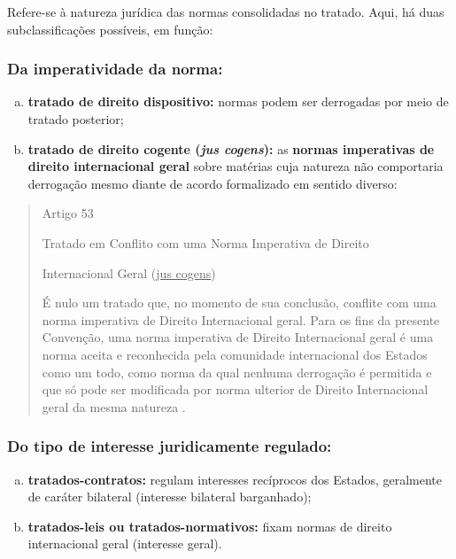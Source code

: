 \documentclass{article}
\begin{document}
Refere-se à natureza jurídica das normas consolidadas no tratado. Aqui, há duas subclassificações possíveis, em função:

\subsubsection{Da imperatividade da norma:}

\begin{enumerate}[(a)]
    \item \textbf{tratado de direito dispositivo:} normas podem ser derrogadas por meio de tratado posterior;
    \item \textbf{tratado de direito cogente (\textit{jus cogens}):} as \textbf{normas imperativas de direito internacional geral} sobre matérias cuja natureza não comportaria derrogação mesmo diante de acordo formalizado em sentido diverso:
\end{enumerate}

\begin{quote}
\begin{center}
    Artigo 53

Tratado em Conflito com uma Norma Imperativa de Direito

Internacional Geral (\underline{jus cogens})
\end{center} 

É nulo um tratado que, no momento de sua conclusão, conflite com uma norma imperativa de Direito Internacional geral. Para os fins da presente Convenção, uma norma imperativa de Direito Internacional geral é uma norma aceita e reconhecida pela comunidade internacional dos Estados como um todo, como norma da qual nenhuma derrogação é permitida e que só pode ser modificada por norma ulterior de Direito Internacional geral da mesma natureza \cite{brasil_decreto_2009}.
\end{quote}

\subsubsection{Do tipo de interesse juridicamente regulado:}

\begin{enumerate}[(a)]
    \item \textbf{tratados-contratos:} regulam interesses recíprocos dos Estados, geralmente de caráter bilateral (interesse bilateral barganhado);
    \item \textbf{tratados-leis ou tratados-normativos:} fixam normas de direito internacional geral (interesse geral).
\end{enumerate}
\end{document}
